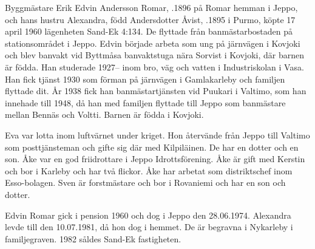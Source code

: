 Byggmästare Erik Edvin Andersson Romar, .1896 på Romar hemman i Jeppo, och hans hustru Alexandra, född Andersdotter Åvist, .1895 i Purmo, köpte 17 april 1960 lägenheten Sand-Ek 4:134. De flyttade från banmästarbostaden på stationsområdet i Jeppo. Edvin började arbeta som ung på järnvägen i Kovjoki och blev banvakt vid Byttmåsa banvaktstuga nära Sorvist i Kovjoki, där barnen är födda. Han studerade 1927-- inom bro, väg och vatten i Industriskolan i Vasa. Han fick tjänst 1930 som förman på järnvägen i Gamlakarleby och familjen flyttade dit. År 1938 fick han banmästartjänsten vid Puukari i Valtimo, som han innehade till 1948, då han med familjen flyttade till Jeppo som banmästare mellan Bennäs och Voltti. Barnen är födda i Kovjoki.
\begin{jhchildren}
  \item {}
  \item {}
  \item {}
  \item {}
\end{jhchildren}
Eva var lotta inom luftvärnet under kriget. Hon återvände från Jeppo till Valtimo som posttjänsteman och gifte sig där med Kilpiläinen. De har en dotter och en son. Åke var en god friidrottare i Jeppo Idrottsförening. Åke är gift med Kerstin och bor i Karleby och har två flickor. Åke har arbetat som distriktschef inom Esso-bolagen. Sven är forstmästare och bor i Rovaniemi och har en son och dotter.

Edvin Romar gick i pension 1960 och dog i Jeppo den 28.06.1974. Alexandra levde till den 10.07.1981, då hon dog i hemmet. De är begravna i Nykarleby i familjegraven. 1982 såldes Sand-Ek fastigheten.


